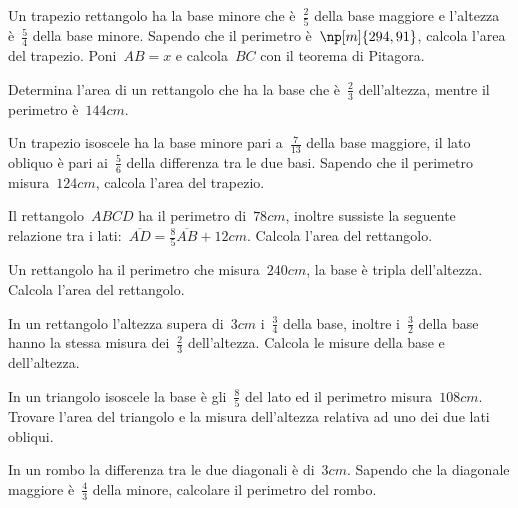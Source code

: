 \begin{multicols}{2}
\begin{esercizio}[\Ast]
\label{ese:16.118}
Un trapezio rettangolo ha la base minore che è~$\frac{2}{5}$ della base maggiore e l'altezza è~$\frac{5}{4}$ della base minore. Sapendo che il perimetro è~$\np[m]{294,91}$, calcola l'area del trapezio. Poni~$AB=x$ e calcola~$BC$ con il teorema di Pitagora.
\end{esercizio}

\begin{esercizio}
\label{ese:16.119}
Determina l'area di un rettangolo che ha la base che è~$\frac{2}{3}$ dell'altezza, mentre il perimetro è~$144\unit{cm}$.
\end{esercizio}

\begin{esercizio}[\Ast]
\label{ese:16.120}
Un trapezio isoscele ha la base minore pari a~$\frac{7}{13}$ della base maggiore, il lato obliquo è pari ai~$\frac{5}{6}$ della differenza tra le due basi. Sapendo che il perimetro misura~$124\unit{cm}$, calcola l'area del trapezio.
\end{esercizio}

\begin{esercizio}[\Ast]
\label{ese:16.121}
Il rettangolo~$ABCD$ ha il perimetro di~$78\unit{cm}$, inoltre sussiste la seguente relazione tra i lati:~$\overline{AD}=\frac{8}{5}\overline{AB}+12\unit{cm}$. Calcola l'area del rettangolo.
\end{esercizio}

\begin{esercizio}[\Ast]
\label{ese:16.122}
Un rettangolo ha il perimetro che misura~$240\unit{cm}$, la base è tripla dell'altezza. Calcola l'area del rettangolo.
\end{esercizio}

\begin{esercizio}[\Ast]
\label{ese:16.123}
In un rettangolo l'altezza supera di~$3\unit{cm}$ i~$\frac{3}{4}$ della base, inoltre i~$\frac{3}{2}$ della base hanno la stessa misura dei~$\frac{2}{3}$ dell'altezza. Calcola le misure della base e dell'altezza.
\end{esercizio}

\begin{esercizio}[\Ast]
\label{ese:16.124}
In un triangolo isoscele la base è gli~$\frac{8}{5}$ del lato ed il perimetro misura~$108\unit{cm}$. Trovare l'area del triangolo e la misura dell'altezza relativa ad uno dei due lati obliqui.
\end{esercizio}

\begin{esercizio}[\Ast]
\label{ese:16.125}
In un rombo la differenza tra le due diagonali è di~$3\unit{cm}$. Sapendo che la diagonale maggiore è~$\frac{4}{3}$ della minore, calcolare il perimetro del rombo.
\end{esercizio}


\end{multicols}
